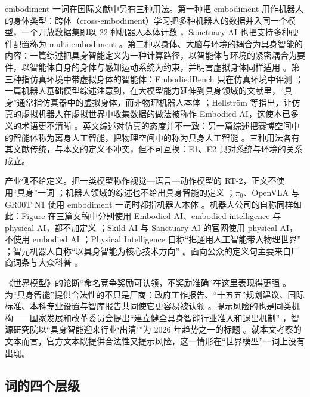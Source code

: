 \documentclass[10pt,fontset=fandol]{ctexart}
\begin{document}
embodiment 一词在国际文献中另有三种用法。第一种把 embodiment 用作机器人的身体类型：跨体（cross-embodiment）学习把多种机器人的数据并入同一个模型，一个开放数据集即以 22 种机器人本体计数 \cite{oneill2024,black2024,kim2024,nvidiagroot2025}，Sanctuary AI 也把支持多种硬件配置称为 multi-embodiment \cite{sanctuary}。第二种以身体、大脑与环境的耦合为具身智能的内容：一篇综述把具身智能定义为一种计算路径，以智能体与环境的紧密耦合为要件，以智能体自身的身体与感知运动系统为约束，并明言虚拟身体同样适用 \cite{liu2025csur}。第三种指仿真环境中带虚拟身体的智能体：EmbodiedBench 只在仿真环境中评测 \cite{yang2025embodiedbench}；一篇机器人基础模型综述注意到，在大模型能力延伸到具身领域的文献里，“具身”通常指仿真器中的虚拟身体，而非物理机器人本体 \cite{firoozi2025}；Hellström 等指出，让仿真的虚拟机器人在虚拟世界中收集数据的做法被称作 Embodied AI，这使本已多义的术语更不清晰 \cite{hellstrom2024}。英文综述对仿真的态度并不一致：另一篇综述把赛博空间中的智能体称为离身人工智能，把物理空间中的称为具身人工智能 \cite{liu2024survey}。三种用法各有其文献传统，与本文的定义不冲突，但不可互换：E1、E2 只对系统与环境的关系成立。

产业侧不给定义。把一类模型称作视觉—语言—动作模型的 RT-2，正文不使用“具身”一词 \cite{brohan2023}；机器人领域的综述也不给出具身智能的定义 \cite{firoozi2025}；$\pi_0$、OpenVLA 与 GR00T N1 使用 embodiment 一词时都指机器人本体 \cite{black2024,kim2024,nvidiagroot2025}。机器人公司的自称同样如此：Figure 在三篇文稿中分别使用 Embodied AI、embodied intelligence 与 physical AI，都不加定义 \cite{figure_helix,figure_seriesc,figure_f03}；Skild AI 与 Sanctuary AI 的官网使用 physical AI，不使用 embodied AI \cite{skild,sanctuary}；Physical Intelligence 自称“把通用人工智能带入物理世界” \cite{pi}；智元机器人自称“以具身智能为核心技术方向” \cite{agibot}。面向公众的定义句主要来自厂商词条与大众科普 \cite{nvglossary,livescience2024}。

《世界模型》的论断“命名竞争奖励可认领，不奖励准确”在这里表现得更强 \cite{yu2026wm}。为“具身智能”提供合法性的不只是厂商：政府工作报告、“十五五”规划建议、国际标准、本科专业设置与智库报告共同使它更容易被认领 \cite{plan2026,itu2025}。提示风险的也是同类机构——国家发展和改革委员会提出“建立健全具身智能行业准入和退出机制” \cite{ndrc2025}，智源研究院以“具身智能迎来行业‘出清’”为 2026 年趋势之一的标题 \cite{baai2026}。就本文考察的文本而言，官方文本既提供合法性又提示风险，这一情形在“世界模型”一词上没有出现。

\subsection{词的四个层级}
\end{document}

